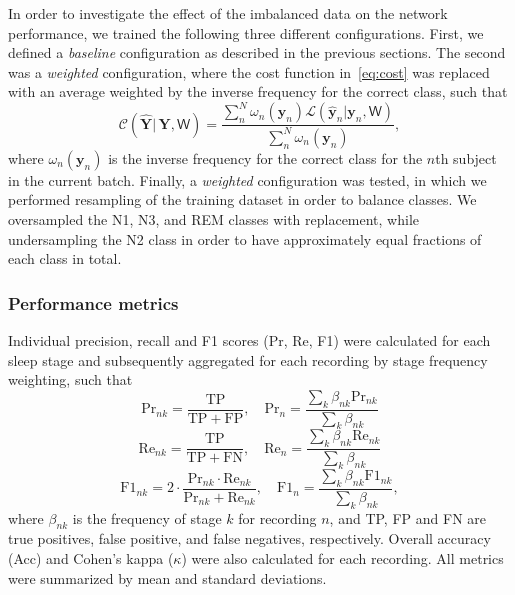 In order to investigate the effect of the imbalanced data on the network performance, we trained the following three different configurations.
First, we defined a \textit{baseline} configuration as described in the previous sections.
The second was a \textit{weighted} configuration, where the cost function in~\cref{eq:cost} was replaced with an average weighted by the inverse frequency for the correct class, such that
\begin{equation}
    \mathcal{C}(\hat{\mathbf{Y}} |\, \mathbf{Y},\mathsf{W}) = \frac{\sum_{n}^{N} \omega_{n}(\mathbf{y}_{n}) \mathcal{L}(\hat{\mathbf{y}}_{n} | \mathbf{y}_{n},\mathsf{W})}{\sum_{n}^{N} \omega_{n}(\mathbf{y}_{n})},
\end{equation}
where $\omega_{n}(\mathbf{y}_{n})$ is the inverse frequency for the correct class for the $n$th subject in the current batch.
Finally, a \textit{weighted} configuration was tested, in which we performed resampling of the training dataset in order to balance classes.
We oversampled the N1, N3, and REM classes with replacement, while undersampling the N2 class in order to have approximately equal fractions of each class in total.


\subsubsection{Performance metrics}
Individual precision, recall and F1 scores (Pr, Re, F1) were calculated for each sleep stage and subsequently aggregated for each recording by stage frequency weighting, such that
\begin{equation}
    \mathrm{Pr}_{nk} = \frac{\mathrm{TP}}{\mathrm{TP} + \mathrm{FP}}, \quad \mathrm{Pr}_{n} = \frac{\sum_{k}{\beta_{nk} \mathrm{Pr}_{nk}}}{\sum_{k}\beta_{nk}}
\end{equation}
\begin{equation}
    \mathrm{Re}_{nk} = \frac{\mathrm{TP}}{\mathrm{TP} + \mathrm{FN}}, \quad \mathrm{Re}_{n} = \frac{\sum_{k}{\beta_{nk} \mathrm{Re}_{nk}}}{\sum_{k}\beta_{nk}}
\end{equation}
\begin{equation}
    \mathrm{F1}_{nk} = 2 \cdot \frac{\mathrm{Pr}_{nk} \cdot \mathrm{Re}_{nk}}{\mathrm{Pr}_{nk} + \mathrm{Re}_{nk}}, \quad \mathrm{F1}_{n} = \frac{\sum_{k}{\beta_{nk} \mathrm{F1}_{nk}}}{\sum_{k}\beta_{nk}},
\end{equation}
where $\beta_{nk}$ is the frequency of stage $k$ for recording $n$, and TP, FP and FN are true positives, false positive, and false negatives, respectively. 
Overall accuracy (Acc) and Cohen's kappa ($\kappa$) were also calculated for each recording.
All metrics were summarized by mean and standard deviations.

